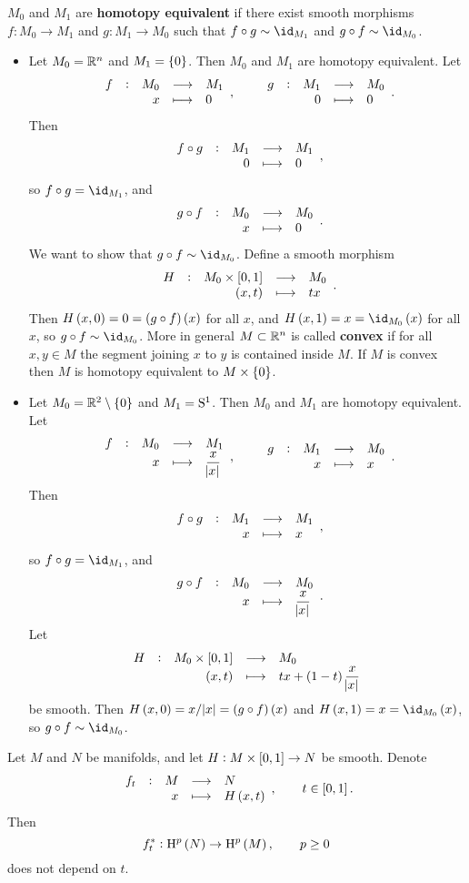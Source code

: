 \begin{definition}
$ M_0 $ and $ M_1 $ are \textbf{homotopy equivalent} if there exist smooth morphisms $ f : M_0 \to M_1 $ and $ g : M_1 \to M_0 $ such that $ f \circ g \sim \id_{M_1} $ and $ g \circ f \sim \id_{M_0} $.
\end{definition}

\begin{example}
\label{eg:2.12}
\hfill
\begin{itemize}
\item Let $ M_0 = \RR^n $ and $ M_1 = \cbr{0} $. Then $ M_0 $ and $ M_1 $ are homotopy equivalent. Let
$$ \function[f]{M_0}{M_1}{x}{0}, \qquad \function[g]{M_1}{M_0}{0}{0}. $$
Then
$$ \function[f \circ g]{M_1}{M_1}{0}{0}, $$
so $ f \circ g = \id_{M_1} $, and
$$ \function[g \circ f]{M_0}{M_0}{x}{0}. $$
We want to show that $ g \circ f \sim \id_{M_0} $. Define a smooth morphism
$$ \function[H]{M_0 \times \sbr{0, 1}}{M_0}{\br{x, t}}{tx}. $$
Then $ H\br{x, 0} = 0 = \br{g \circ f}\br{x} $ for all $ x $, and $ H\br{x, 1} = x = \id_{M_0}\br{x} $ for all $ x $, so $ g \circ f \sim \id_{M_0} $. More in general $ M \subset \RR^n $ is called \textbf{convex} if for all $ x, y \in M $ the segment joining $ x $ to $ y $ is contained inside $ M $. If $ M $ is convex then $ M $ is homotopy equivalent to $ M \times \cbr{0} $.

\pagebreak

\item Let $ M_0 = \RR^2 \setminus \cbr{0} $ and $ M_1 = \S^1 $. Then $ M_0 $ and $ M_1 $ are homotopy equivalent. Let
$$ \function[f]{M_0}{M_1}{x}{\dfrac{x}{\abs{x}}}, \qquad \function[g]{M_1}{M_0}{x}{x}. $$
Then
$$ \function[f \circ g]{M_1}{M_1}{x}{x}, $$
so $ f \circ g = \id_{M_1} $, and
$$ \function[g \circ f]{M_0}{M_0}{x}{\dfrac{x}{\abs{x}}}. $$
Let
$$ \function[H]{M_0 \times \sbr{0, 1}}{M_0}{\br{x, t}}{tx + \br{1 - t}\dfrac{x}{\abs{x}}} $$
be smooth. Then $ H\br{x, 0} = x / \abs{x} = \br{g \circ f}\br{x} $ and $ H\br{x, 1} = x = \id_{M_0}\br{x} $, so $ g \circ f \sim \id_{M_0} $.
\end{itemize}
\end{example}

\begin{proposition}
\label{prop:2.13}
Let $ M $ and $ N $ be manifolds, and let $ H : M \times \sbr{0, 1} \to N $ be smooth. Denote
$$ \function[f_t]{M}{N}{x}{H\br{x, t}}, \qquad t \in \sbr{0, 1}. $$
Then
$$ f_t^* : \H^p\br{N} \to \H^p\br{M}, \qquad p \ge 0 $$
does not depend on $ t $.
\end{proposition}

